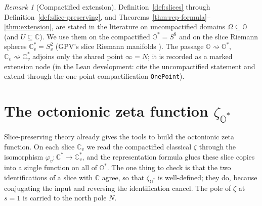 \documentclass[11pt]{article}
\newcommand{\OO}{\mathbb{O}}
\newcommand{\CC}{\mathbb{C}}
\newcommand{\Ostar}{\OO^{*}}
\newcommand{\Cstar}{\CC^{*}}
\newcommand{\zetaO}{\zeta_{\Ostar}}
\theoremstyle{plain}
\theoremstyle{definition}
\theoremstyle{remark}
\newtheorem{remark}[theorem]{Remark}
\begin{document}
\begin{remark}[Compactified extension]\label{rmk:slice-pres-compact}
Definition~\ref{def:slices} through Definition~\ref{def:slice-preserving}, and
Theorems~\ref{thm:rep-formula}--\ref{thm:extension}, are stated in the literature on
uncompactified domains $\Omega\subseteq\OO$ (and $U\subseteq\CC$). We use them on the
compactified $\Ostar=S^8$ and on the slice Riemann spheres $\CC_v^{*}=S^2_v$ (GPV's slice
Riemann manifolds \cite{VS}). The passage $\OO\rightsquigarrow\Ostar$,
$\CC_v\rightsquigarrow\CC_v^{*}$ adjoins only the shared point $\infty=N$; it is recorded as
a marked extension node (in the Lean development: cite the uncompactified statement and
extend through the one-point compactification \texttt{OnePoint}).
\end{remark}

\section{The octonionic zeta function \texorpdfstring{$\zetaO$}{zeta\_O}}

Slice-preserving theory already gives the tools to build the octonionic zeta function. On each slice
$\CC_v$ we read the compactified classical $\zeta$ through the isomorphism
$\varphi_v:\Cstar\to\CC_v^{*}$, and the representation formula glues these slice copies into a single
function on all of $\Ostar$. The one thing to check is that the two identifications of a slice with
$\CC$ agree, so that $\zetaO$ is well-defined; they do, because conjugating the input and reversing
the identification cancel. The pole of $\zeta$ at $s=1$ is carried to the north pole $N$.
\end{document}

